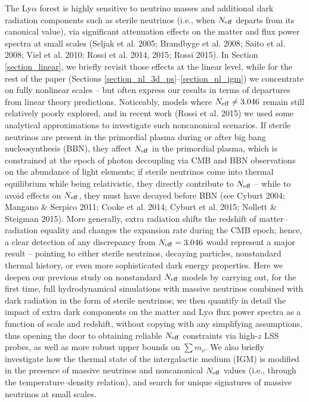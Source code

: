 \documentclass{emulateapj}
\begin{document}

The Ly$\alpha$ forest is highly sensitive to neutrino masses and additional dark radiation components such as sterile neutrinos (i.e., when $N_{\rm eff}$ departs from its canonical value), via 
significant attenuation effects on the matter and flux power spectra at small scales (Seljak et al. 2005; Brandbyge et al. 2008; Saito et al. 2008; Viel et al. 2010; Rossi et al. 2014, 2015; Rossi 2015).
In Section \ref{section_linear}, we briefly revisit those effects at the linear level, while for the rest of the paper (Sections \ref{section_nl_3d_ps}--\ref{section_nl_igm}) 
we concentrate on fully nonlinear scales -- but often express our results in terms
of departures from linear theory predictions.
Noticeably, models where  $N_{\rm eff} \ne 3.046$ remain still relatively poorly explored, and in recent work (Rossi et al. 2015) we 
used some analytical approximations to investigate such noncanonical scenarios.
If sterile neutrinos
are present in the primordial plasma during or after big bang nucleosynthesis (BBN), they affect $N_{\rm eff}$
in the primordial plasma, which is constrained at the epoch of photon decoupling via CMB and BBN observations on the abundance of light elements;
if sterile neutrinos come into thermal equilibrium while being relativistic, they directly contribute to $N_{\rm eff}$ -- while to avoid effects on $N_{\rm eff}$, they must have decayed before BBN 
(see Cyburt 2004; Mangano \& Serpico 2011; Cooke et al.  2014; Cyburt et al. 2015; Nollett \& Steigman 2015).
More generally, extra radiation shifts the redshift of matter--radiation equality and changes the expansion rate during the CMB epoch; hence, a clear detection of any 
discrepancy from $N_{\rm eff} = 3.046$ would represent a major result -- pointing to either sterile neutrinos, decaying particles, nonstandard thermal history, or even 
more sophisticated dark energy properties.  
Here we deepen our previous study on nonstandard $N_{\rm eff}$ models  by carrying out,  for the first time, full
hydrodynamical simulations with massive neutrinos combined with dark radiation in the form of sterile neutrinos; 
we then quantify in detail the impact of extra dark components on the 
matter and Ly$\alpha$ flux power spectra  as a function of scale and redshift,
without copying with any simplifying assumptions, thus opening the door to obtaining reliable $N_{\rm eff}$ constraints via high-$z$ LSS probes, as well as more robust upper bounds on $\sum m_{\nu}$. 
We also briefly investigate how the thermal state of the intergalactic medium (IGM)
 is modified in the presence of massive neutrinos and noncanonical $N_{\rm eff}$ values 
(i.e., through the temperature--density relation), 
and search for unique signatures of massive neutrinos at small scales.
\end{document}
